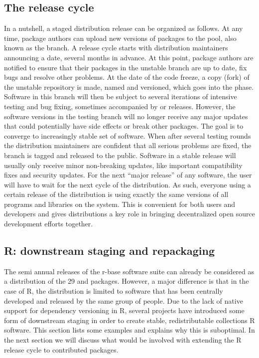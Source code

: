 \subsection{The release cycle}

In a nutshell, a staged distribution release can be organized as follows. At any
time, package authors can upload new versions of packages to the 
pool, also known as the  branch. A release cycle starts with
distribution maintainers announcing a  date, several
months in advance. At this point, package authors are notified to ensure
that their packages in the unstable branch are up to date, fix bugs and resolve
other problems. At the date of the code freeze, a copy (fork) of the unstable
repository is made, named and versioned, which goes into the 
phase. Software in this branch will then be subject to several iterations of
intensive testing and bug fixing, sometimes accompanied by  or
 releases. However, the software versions in the testing branch will
no longer receive any major updates that could potentially have side effects
or break other packages. The goal is to converge to increasingly stable set of
software. When after several testing rounds the distribution maintainers are
confident that all serious problems are fixed, the branch is tagged 
and released to the public. Software in a stable release will usually only
receive minor non-breaking updates, like important compatibility fixes and
security updates. For the next ``major release'' of any software, the user will
have to wait for the next cycle of the distribution. As such, everyone using a
certain release of the distribution is using exactly the same versions of all programs
and libraries on the system. This is convenient for both users and developers
and gives distributions a key role in bringing decentralized open source
development efforts together.

\subsection{R: downstream staging and repackaging}

The semi annual releases of the r-base software suite can already be considered
as a distribution of the 29  and  packages.
However, a major difference is that in the case of R, the distribution is
limited to software that has been centrally developed and released by the same
group of people. Due to the lack of native support for dependency versioning in
R, several projects have introduced some form of downstream staging in order to
create stable, redistributable collections R software. This section lists some
examples and explains why this is suboptimal. In the next section we will
discuss what would be involved with extending the R release cycle to contributed
packages.

